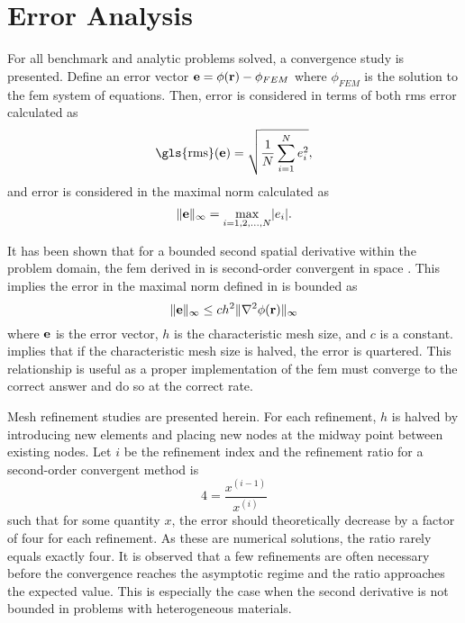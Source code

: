 \section{Error Analysis}
  For all benchmark and analytic problems solved, a convergence study is 
  presented. Define an error vector $\mathbf{e} = \phi(\mathbf{r}) - \phi_{FEM}$ where
  $\phi_{FEM}$ is the solution to the \gls{fem} system of equations. Then, 
  error is considered in terms of both \gls{rms} error calculated as 
  \begin{equation} 
    \label{eq:rms}
    \text{\gls{rms}}(\ve) = \sqrt{\frac{1}{N} \sum_{i=1}^{N} e_i^2},
  \end{equation}
  and error is considered in the maximal norm calculated as
  \begin{equation} 
    \label{eq:infnorm}
    \|\mathbf{e}\|_{\infty} = \max_{i=1,2,\ldots,N} \lvert e_i \rvert.
  \end{equation}

  It has been shown that for a bounded second spatial derivative 
  within the problem domain, the \gls{fem} derived in 
   is second-order convergent in space 
  \cite{textbookli}. This implies the error in the maximal norm defined in 
   is bounded as
  \begin{equation} 
    \label{eq:error_bound}
    \|\mathbf{e}\|_{\infty} \le c h^2 \| \mathbf{\nabla}^2 \phi(\mathbf{r}) \|_{\infty}
  \end{equation}
  where $\mathbf{e}$ is the error vector, $h$ is the characteristic mesh size, and $c$
  is a constant.  implies that if the characteristic mesh 
  size is halved, the error is quartered. This relationship is useful as a 
  proper implementation of the \gls{fem} must converge to the correct answer and 
  do so at the correct rate.
  
  Mesh refinement studies are presented herein. For each refinement, $h$ is 
  halved by introducing new elements and placing new nodes at the midway point
  between existing nodes. Let $i$ be the refinement index and the refinement 
  ratio for a second-order convergent method is 
  \begin{equation}
    4 = \frac{x^{(i-1)}}{x^{(i)}}
  \end{equation}
  such that for some quantity $x$, the error should theoretically decrease by a
  factor of four for each refinement. As these are numerical solutions, the 
  ratio rarely equals exactly four. It is observed that a few refinements are 
  often necessary before the convergence reaches the asymptotic regime and the 
  ratio approaches the expected value. This is especially the case when the 
  second derivative is not bounded in problems with heterogeneous materials.
  
